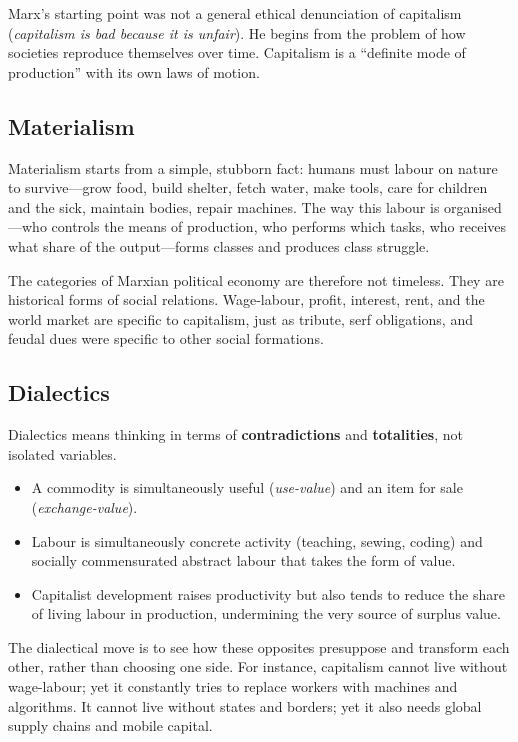 Marx's starting point was not a general ethical denunciation of capitalism (\emph{capitalism is bad because it is unfair}).
He begins from the problem of how societies reproduce themselves over time.
Capitalism is a ``definite mode of production'' with its own laws of motion.\cite{Marx1867,MarxGrundrisse}

\subsection{Materialism}

Materialism starts from a simple, stubborn fact: humans must labour on nature to
survive---grow food, build shelter, fetch water, make tools, care for children and
the sick, maintain bodies, repair machines. The way this labour is organised---who
controls the means of production, who performs which tasks, who receives what share
of the output---forms classes and produces class struggle.

The categories of Marxian political economy are therefore not timeless. They are
historical forms of social relations. Wage-labour, profit, interest, rent, and the
world market are specific to capitalism, just as tribute, serf obligations, and feudal
dues were specific to other social formations.

\subsection{Dialectics}

Dialectics means thinking in terms of \textbf{contradictions} and \textbf{totalities},
not isolated variables.

\begin{itemize}[leftmargin=1.5em]
  \item A commodity is simultaneously useful (\emph{use-value}) and an item for sale (\emph{exchange-value}).
  \item Labour is simultaneously concrete activity (teaching, sewing, coding) and socially commensurated abstract labour that takes the form of value.
  \item Capitalist development raises productivity but also tends to reduce the share of living labour in
        production, undermining the very source of surplus value.
\end{itemize}

The dialectical move is to see how these opposites presuppose and transform each other,
rather than choosing one side. For instance, capitalism cannot live without wage-labour;
yet it constantly tries to replace workers with machines and algorithms. It cannot live
without states and borders; yet it also needs global supply chains and mobile capital.

